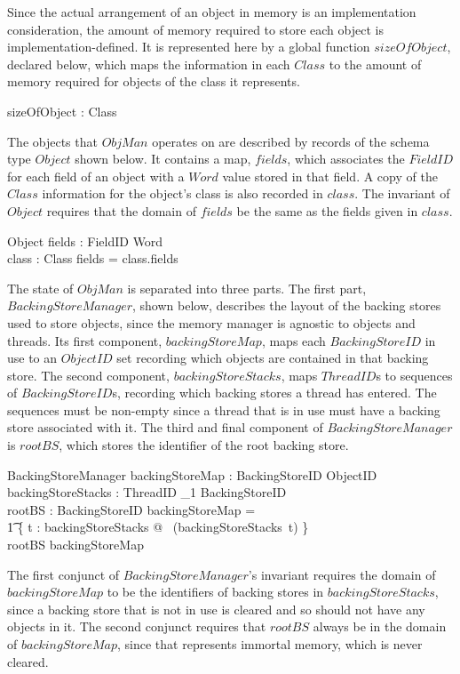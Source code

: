 Since the actual arrangement of an object in memory is an
implementation consideration, the amount of memory required to store
each object is implementation-defined.
It is represented here by a global function $sizeOfObject$, declared
below, which maps the information in each $Class$ to the amount of
memory required for objects of the class it represents.
\begin{axdef}
  sizeOfObject : Class \fun \nat
\end{axdef}

The objects that $ObjMan$ operates on are described by records of the
schema type $Object$ shown below.
It contains a map, $fields$, which associates the $FieldID$ for each
field of an object with a $Word$ value stored in that field.
A copy of the $Class$ information for the object's class is also
recorded in $class$.
The invariant of $Object$ requires that the domain of $fields$ be the
same as the fields given in $class$.
\begin{schema}{Object}
  fields : FieldID \pfun Word \\
  class : Class
\where
  \dom fields = class.fields
\end{schema}      

The state of $ObjMan$ is separated into three parts.
The first part, $BackingStoreManager$, shown below, describes the
layout of the backing stores used to store objects, since the memory
manager is agnostic to objects and threads.
Its first component, $backingStoreMap$, maps each $BackingStoreID$ in
use to an $ObjectID$ set recording which objects are contained in that
backing store.
The second component, $backingStoreStacks$, maps $ThreadID$s to
sequences of $BackingStoreID$s, recording which backing stores a
thread has entered.
The sequences must be non-empty since a thread that is in use must
have a backing store associated with it.
The third and final component of $BackingStoreManager$ is $rootBS$,
which stores the identifier of the root backing store.
\begin{schema}{BackingStoreManager}
	backingStoreMap : BackingStoreID \pfun \finset ObjectID \\
	backingStoreStacks : ThreadID \pfun \seq_1 BackingStoreID \\
	rootBS : BackingStoreID
\where
	\dom backingStoreMap = {} \\
	\t1 \bigcup \{ t : \dom backingStoreStacks @ \ran~(backingStoreStacks~t) \} \\
	rootBS \in \dom backingStoreMap
\end{schema}
The first conjunct of $BackingStoreManager$'s invariant requires the
domain of $backingStoreMap$ to be the identifiers of backing stores in
$backingStoreStacks$, since a backing store that is not in use is
cleared and so should not have any objects in it.
The second conjunct requires that $rootBS$ always be in the domain of
$backingStoreMap$, since that represents immortal memory, which is
never cleared.

